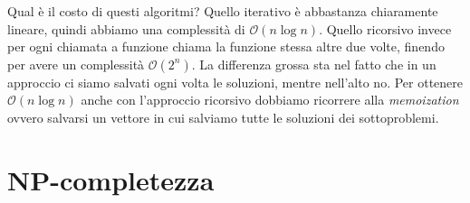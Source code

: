 \documentclass[11pt]{scrartcl}
\newcommand{\bigo}{\mathcal{O}}
\begin{document}
	Qual è il costo di questi algoritmi? Quello iterativo è abbastanza chiaramente lineare, quindi abbiamo una complessità di $\bigo(n\log n)$. Quello ricorsivo invece per ogni chiamata a funzione chiama la funzione stessa altre due volte, finendo per avere un complessità $\bigo(2^n)$. La differenza grossa sta nel fatto che in un approccio ci siamo salvati ogni volta le soluzioni, mentre nell'alto no. Per ottenere $\bigo(n\log n)$ anche con l'approccio ricorsivo dobbiamo ricorrere alla \textit{memoization} ovvero salvarsi un vettore in cui salviamo tutte le soluzioni dei sottoproblemi.
	
	\newpage
	
	\section{NP-completezza}
	
\end{document}
